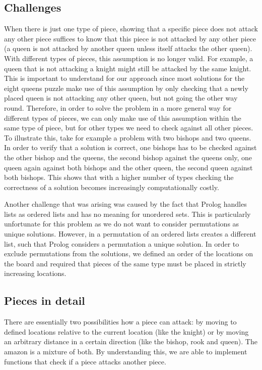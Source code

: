 \documentclass{article}
\begin{document}
\subsection{Challenges}

When there is just one type of piece, showing that a specific piece does not attack any other piece suffices to know that this piece is not attacked by any other piece (a queen is not attacked by another queen unless itself attacks the other queen). With different types of pieces, this assumption is no longer valid. For example, a queen that is not attacking a knight might still be attacked by the same knight. This is important to understand for our approach since most solutions for the eight queens puzzle make use of this assumption by only checking that a newly placed queen is not attacking any other queen, but not going the other way round. Therefore, in order to solve the problem in a more general way for different types of pieces, we can only make use of this assumption within the same type of piece, but for other types we need to check against all other pieces. To illustrate this, take for example a problem with two bishops and two queens. In order to verify that a solution is correct, one bishops has to be checked against the other bishop and the queens, the second bishop against the queens only, one queen again against both bishops and the other queen, the second queen against both bishops. This shows that with a higher number of types checking the correctness of a solution becomes increasingly computationally costly.

Another challenge that was arising was caused by the fact that Prolog handles lists as ordered lists and has no meaning for unordered sets. This is particularly unfortunate for this problem as we do not want to consider permutations as unique solutions. However, in a permutation of an ordered lists creates a different list, such that Prolog considers a permutation a unique solution. In order to exclude permutations from the solutions, we defined an order of the locations on the board and required that pieces of the same type must be placed in strictly increasing locations.

\subsection{Pieces in detail}

There are essentially two possibilities how a piece can attack: by moving to defined locations relative to the current location (like the knight) or by moving an arbitrary distance in a certain direction (like the bishop, rook and queen). The amazon is a mixture of both. By understanding this, we are able to implement functions that check if a piece attacks another piece.
\end{document}
